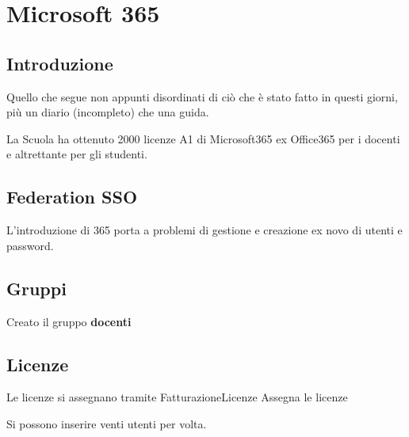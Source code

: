 \chapter{Microsoft 365}
\section{Introduzione}
Quello che segue non appunti disordinati di ciò che è stato fatto in questi giorni, più un diario (incompleto) che una guida.

La Scuola ha ottenuto 2000 licenze A1 di Microsoft365 ex Office365 per i docenti e altrettante per gli studenti.
\section{Federation SSO}
L'introduzione di 365 porta a problemi di gestione e creazione ex novo di utenti e password.
\section{Gruppi}
Creato il gruppo \textbf{docenti}
\section{Licenze}
Le licenze si assegnano tramite Fatturazione\textrightarrow Licenze \textrightarrow Assegna le licenze 

Si possono inserire venti utenti per volta. 